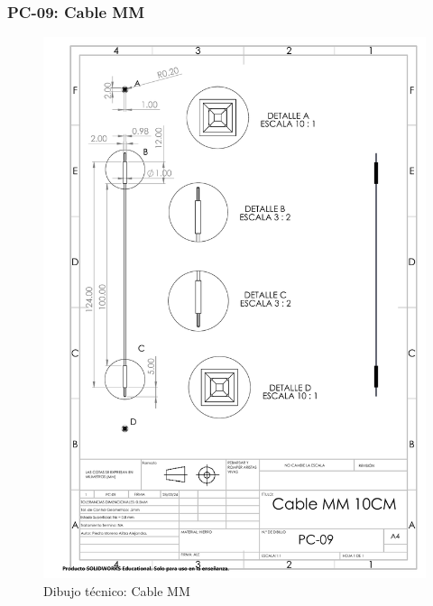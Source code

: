     \subsubsection{PC-09: Cable MM }
    \begin{figure}[H]
        \centering
        \includegraphics[trim = {7mm 1mm 1mm 1mm},clip,scale=0.4]{22/Img/cableMMDibujo.PDF}
        \caption{Dibujo técnico: Cable MM}
        \label{fig:enter-label9}
    \end{figure}
    
